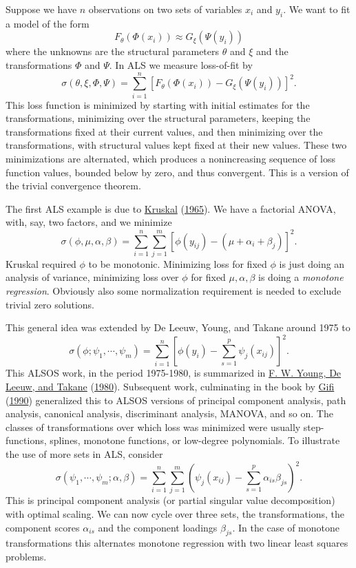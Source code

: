 \documentclass[
  12pt,
]{book}
\begin{document}
Suppose we have \(n\) observations on two sets of variables \(x_i\)
and \(y_i.\) We want to fit a model of the form
\[
F_\theta(\Phi(x_i))\approx G_\xi(\Psi(y_i))
\]
where the unknowns are the structural parameters \(\theta\) and \(\xi\)
and the transformations \(\Phi\) and \(\Psi.\)
In ALS we measure loss-of-fit by
\[
\sigma(\theta,\xi,\Phi,\Psi)=
\sum_{i=1}^n[F_\theta(\Phi(x_i))-G_\xi(\Psi(y_i))]^2.
\]
This loss function is minimized by starting with initial estimates
for the transformations, minimizing over the structural
parameters, keeping the transformations fixed at their
current values, and then minimizing over the transformations,
with structural values kept fixed at their new values.
These two minimizations are alternated, which produces a
nonincreasing sequence of loss function values, bounded
below by zero, and thus convergent. This is a version of
the trivial convergence theorem.

The first ALS example is due to \protect\hyperlink{ref-kruskal_65}{Kruskal} (\protect\hyperlink{ref-kruskal_65}{1965}).
We have a factorial ANOVA, with, say, two factors, and we
minimize
\[
\sigma(\phi,\mu,\alpha,\beta)=
\sum_{i=1}^n\sum_{j=1}^m[\phi(y_{ij})-(\mu+\alpha_i+\beta_j)]^2.
\]
Kruskal required \(\phi\) to be monotonic. Minimizing loss for fixed \(\phi\) is just doing an analysis of variance, minimizing
loss over \(\phi\) for fixed \(\mu,\alpha,\beta\) is doing a
\emph{monotone regression}. Obviously also some normalization
requirement is needed to exclude trivial zero solutions.

This general idea was extended by
De Leeuw, Young, and Takane around 1975 to
\[
\sigma(\phi;\psi_1,\cdots,\psi_m)=
\sum_{i=1}^n[\phi(y_i)-\sum_{s=1}^p\psi_j(x_{ij})]^2.
\]
This ALSOS work, in the period 1975-1980, is summarized in \protect\hyperlink{ref-young_deleeuw_takane_C_80}{F. W. Young, De Leeuw, and Takane} (\protect\hyperlink{ref-young_deleeuw_takane_C_80}{1980}).
Subsequent work, culminating in the book by \protect\hyperlink{ref-gifi_B_90}{Gifi} (\protect\hyperlink{ref-gifi_B_90}{1990})
generalized this to
ALSOS versions of principal component analysis, path analysis, canonical
analysis, discriminant analysis, MANOVA, and so on.
The classes of transformations over which loss was minimized were
usually step-functions, splines, monotone functions, or low-degree
polynomials. To illustrate the use of more sets in ALS, consider
\[
\sigma(\psi_1,\cdots,\psi_m;\alpha,\beta)=
\sum_{i=1}^n\sum_{j=1}^m (\psi_j(x_{ij})-
\sum_{s=1}^p\alpha_{is}\beta_{js})^2.
\]
This is principal component analysis (or partial singular value
decomposition) with optimal scaling. We can now cycle over three
sets, the transformations, the component scores \(\alpha_{is}\)
and the component loadings \(\beta_{js}.\) In the case of
monotone transformations this alternates
monotone regression with two linear least squares problems.
\end{document}
